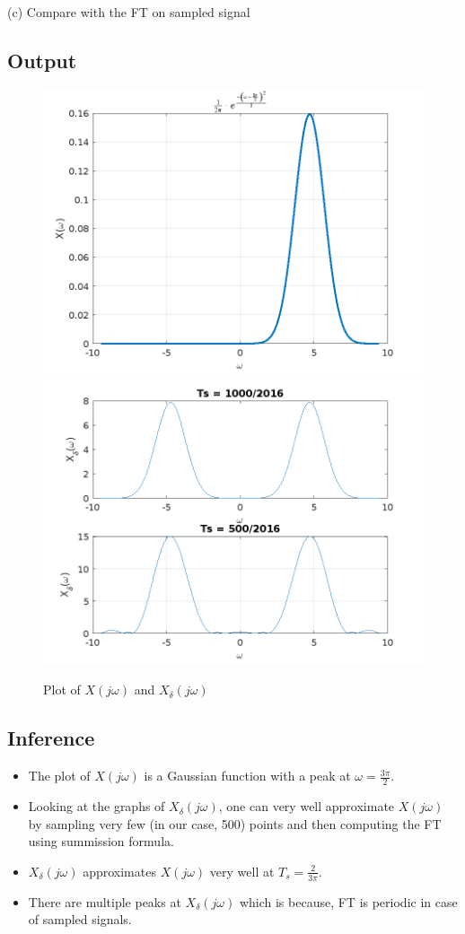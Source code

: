 (c) Compare with the FT on sampled signal




\subsection*{Output}

\begin{figure}[H]
    \centering
    \includegraphics[width = .49\textwidth]{./imgs/2_plot_Xw.png}\hfill
    \includegraphics[width = .49\textwidth]{./imgs/2_plot_Xdelw.png}
    \caption {Plot of $X(j\omega)$ and $X_\delta(j\omega)$}
\end{figure}


\subsection*{Inference}

\begin{itemize}
    \item The plot of $X(j\omega)$ is a Gaussian function with a peak at $\omega = \frac{3\pi}{2}$.
    \item Looking at the graphs of $X_\delta(j\omega)$, one can very well approximate $X(j\omega)$ by sampling very few (in our case, 500) points and then computing the FT using summission formula.
    \item $X_\delta(j\omega)$ approximates $X(j\omega)$ very well at $T_s = \frac{2}{3\pi}$.
    \item There are multiple peaks at $X_\delta(j\omega)$ which is because, FT is periodic in case of sampled signals.
\end{itemize}